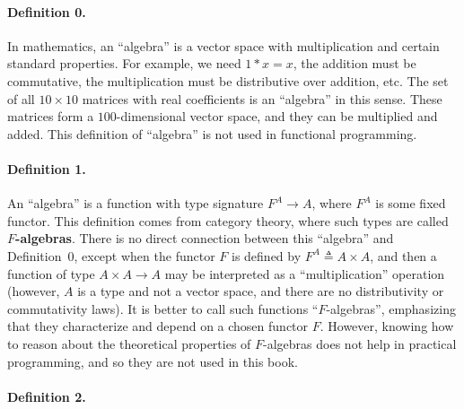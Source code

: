 \paragraph{Definition 0.}

In mathematics, an \textquotedblleft algebra\textquotedblright{} is
a vector space with multiplication and certain standard properties.
For example, we need $1*x=x$, the addition must be commutative, the
multiplication must be distributive over addition, etc. The set of
all $10\times10$ matrices with real coefficients is an \textquotedblleft algebra\textquotedblright{}
in this sense. These matrices form a $100$-dimensional vector space,
and they can be multiplied and added. This definition of \textsf{``}algebra\textsf{''}
is not used in functional programming.

\paragraph{Definition 1.}

An \textsf{``}algebra\textsf{''} is a function with type signature $F^{A}\rightarrow A$,
where $F^{A}$ is some fixed functor. This definition comes from category
theory, where such types are called \textbf{$F$-algebras}.
There is no direct connection between this \textsf{``}algebra\textsf{''} and Definition~0,
except when the functor $F$ is defined by $F^{A}\triangleq A\times A$,
and then a function of type $A\times A\rightarrow A$ may be interpreted
as a \textsf{``}multiplication\textsf{''} operation (however, $A$ is a type and not
a vector space, and there are no distributivity or commutativity laws).
It is better to call such functions \textsf{``}$F$-algebras\textsf{''}, emphasizing
that they characterize and depend on a chosen functor $F$. However,
knowing how to reason about the theoretical properties of $F$-algebras
does not help in practical programming, and so they are not used in
this book.

\paragraph{Definition 2.}

